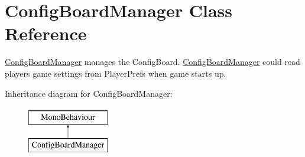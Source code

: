 \hypertarget{class_config_board_manager}{}\section{Config\+Board\+Manager Class Reference}
\label{class_config_board_manager}


\hyperlink{class_config_board_manager}{Config\+Board\+Manager} manages the Config\+Board. \hyperlink{class_config_board_manager}{Config\+Board\+Manager} could read player\textquotesingle{}s game settings from Player\+Prefs when game starts up.  


Inheritance diagram for Config\+Board\+Manager\+:\begin{figure}[H]
\begin{center}
\leavevmode
\includegraphics[height=2.000000cm]{class_config_board_manager}
\end{center}
\end{figure}
